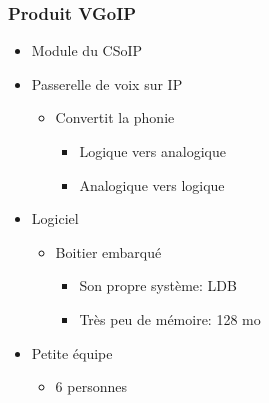 \begin{frame}
    \frametitle{Produit VGoIP}
    \begin{itemize}
        \item Module du CSoIP
        \item Passerelle de voix sur IP
            \begin{itemize}
                \item Convertit la phonie
                    \begin{itemize}
                        \item Logique vers analogique
                        \item Analogique vers logique
                    \end{itemize}
            \end{itemize}
        \item Logiciel
        \begin{itemize}
            \item Boitier embarqué
                \begin{itemize}
                    \item Son propre système: LDB
                    \item Très peu de mémoire: 128 mo
                \end{itemize}
        \end{itemize}
        \item Petite équipe
            \begin{itemize}
                \item 6 personnes
            \end{itemize}
    \end{itemize}
\end{frame}